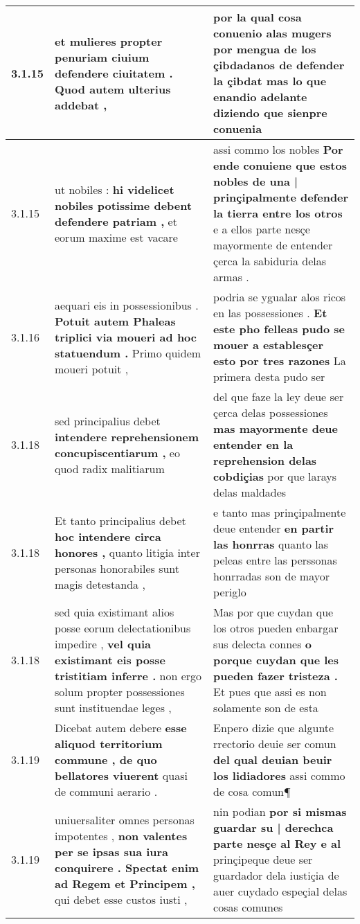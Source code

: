 \begin{tabular}{|p{1cm}|p{6.5cm}|p{6.5cm}|}
3.1.15 & et mulieres \textbf{ propter penuriam ciuium defendere ciuitatem . } Quod autem ulterius addebat , & por la qual cosa conuenio alas mugers \textbf{ por mengua de los çibdadanos de defender la çibdat mas lo que enandio adelante diziendo } que sienpre conuenia \\\hline
3.1.15 & ut nobiles : \textbf{ hi videlicet nobiles potissime debent defendere patriam , } et eorum maxime est vacare & assi commo los nobles \textbf{ Por ende conuiene que estos nobles de una | prinçipalmente defender la tierra entre los otros } e a ellos parte nesçe mayormente de entender çerca la sabiduria delas armas . \\\hline
3.1.16 & aequari eis in possessionibus . \textbf{ Potuit autem Phaleas triplici via moueri ad hoc statuendum . } Primo quidem moueri potuit , & podria se ygualar alos ricos en las possessiones . \textbf{ Et este pho felleas pudo se mouer a establesçer esto por tres razones } La primera desta pudo ser \\\hline
3.1.18 & sed principalius debet \textbf{ intendere reprehensionem concupiscentiarum , } eo quod radix malitiarum & del que faze la ley deue ser çerca delas possessiones \textbf{ mas mayormente deue entender en la reprehension delas cobdiçias } por que larays delas maldades \\\hline
3.1.18 & Et tanto principalius debet \textbf{ hoc intendere circa honores , } quanto litigia inter personas honorabiles sunt magis detestanda , & e tanto mas prinçipalmente deue entender \textbf{ en partir las honrras } quanto las peleas entre las perssonas honrradas son de mayor periglo \\\hline
3.1.18 & sed quia existimant alios posse eorum delectationibus impedire , \textbf{ vel quia existimant eis posse tristitiam inferre . } non ergo solum propter possessiones sunt instituendae leges , & Mas por que cuydan que los otros pueden enbargar sus delecta connes \textbf{ o porque cuydan que les pueden fazer tristeza . } Et pues que assi es non solamente son de esta \\\hline
3.1.19 & Dicebat autem debere \textbf{ esse aliquod territorium commune , de quo bellatores viuerent } quasi de communi aerario . & Enpero dizie que algunte rrectorio deuie ser comun \textbf{ del qual deuian beuir los lidiadores } assi commo de cosa comun¶ \\\hline
3.1.19 & uniuersaliter omnes personas impotentes , \textbf{ non valentes per se ipsas sua iura conquirere . Spectat enim ad Regem et Principem , } qui debet esse custos iusti , & nin podian \textbf{ por si mismas guardar su | derechca parte nesçe al Rey e al } prinçipeque deue ser guardador dela iustiçia de auer cuydado espeçial delas cosas comunes \\\hline

\end{tabular}
